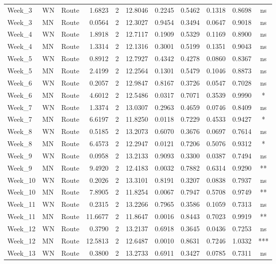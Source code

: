 \documentclass[
  12pt,
  letterpaper,
]{article}
\begin{document}
\begin{longtable}{lllrrrlrrrc}
Week\_3 & WN & Route & 1.6823 & 2 & 12.8046 & 0.2245 & 0.5462 & 0.1318 & 0.8698 & ns \\ 
Week\_3 & MN & Route & 0.0564 & 2 & 12.3027 & 0.9454 & 0.3494 & 0.0647 & 0.9018 & ns \\ 
Week\_4 & WN & Route & 1.8918 & 2 & 12.7117 & 0.1909 & 0.5329 & 0.1169 & 0.8900 & ns \\ 
Week\_4 & MN & Route & 1.3314 & 2 & 12.1316 & 0.3001 & 0.5199 & 0.1351 & 0.9043 & ns \\ 
Week\_5 & WN & Route & 0.8912 & 2 & 12.7927 & 0.4342 & 0.4278 & 0.0860 & 0.8367 & ns \\ 
Week\_5 & MN & Route & 2.4199 & 2 & 12.2564 & 0.1301 & 0.5479 & 0.1046 & 0.8873 & ns \\ 
Week\_6 & WN & Route & 0.2057 & 2 & 12.9847 & 0.8167 & 0.3726 & 0.0547 & 0.7028 & ns \\ 
Week\_6 & MN & Route & 4.6012 & 2 & 12.5486 & 0.0317 & 0.7071 & 0.3539 & 0.9990 & * \\ 
Week\_7 & WN & Route & 1.3374 & 2 & 13.0307 & 0.2963 & 0.4659 & 0.0746 & 0.8409 & ns \\ 
Week\_7 & MN & Route & 6.6197 & 2 & 11.8250 & 0.0118 & 0.7229 & 0.4533 & 0.9427 & * \\ 
Week\_8 & WN & Route & 0.5185 & 2 & 13.2073 & 0.6070 & 0.3676 & 0.0697 & 0.7614 & ns \\ 
Week\_8 & MN & Route & 6.4573 & 2 & 12.2947 & 0.0121 & 0.7206 & 0.5076 & 0.9312 & * \\ 
Week\_9 & WN & Route & 0.0958 & 2 & 13.2133 & 0.9093 & 0.3300 & 0.0387 & 0.7494 & ns \\ 
Week\_9 & MN & Route & 9.4920 & 2 & 12.4183 & 0.0032 & 0.7882 & 0.6314 & 0.9290 & ** \\ 
Week\_10 & WN & Route & 0.2026 & 2 & 13.3101 & 0.8191 & 0.3207 & 0.0838 & 0.7937 & ns \\ 
Week\_10 & MN & Route & 7.8905 & 2 & 11.8254 & 0.0067 & 0.7947 & 0.5708 & 0.9749 & ** \\ 
Week\_11 & WN & Route & 0.2315 & 2 & 13.2266 & 0.7965 & 0.3586 & 0.1059 & 0.7313 & ns \\ 
Week\_11 & MN & Route & 11.6677 & 2 & 11.8647 & 0.0016 & 0.8443 & 0.7023 & 0.9919 & ** \\ 
Week\_12 & WN & Route & 0.3790 & 2 & 13.2137 & 0.6918 & 0.3645 & 0.0436 & 0.7253 & ns \\ 
Week\_12 & MN & Route & 12.5813 & 2 & 12.6487 & 0.0010 & 0.8631 & 0.7246 & 1.0332 & *** \\ 
Week\_13 & WN & Route & 0.3800 & 2 & 13.2733 & 0.6911 & 0.3427 & 0.0785 & 0.7311 & ns \\ 

\end{longtable}
\end{document}
